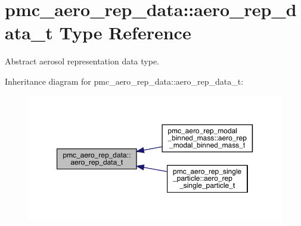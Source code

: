 \hypertarget{structpmc__aero__rep__data_1_1aero__rep__data__t}{}\section{pmc\+\_\+aero\+\_\+rep\+\_\+data\+:\+:aero\+\_\+rep\+\_\+data\+\_\+t Type Reference}
\label{structpmc__aero__rep__data_1_1aero__rep__data__t}


Abstract aerosol representation data type.  




Inheritance diagram for pmc\+\_\+aero\+\_\+rep\+\_\+data\+:\+:aero\+\_\+rep\+\_\+data\+\_\+t\+:\nopagebreak
\begin{figure}[H]
\begin{center}
\leavevmode
\includegraphics[width=350pt]{structpmc__aero__rep__data_1_1aero__rep__data__t__inherit__graph}
\end{center}
\end{figure}
